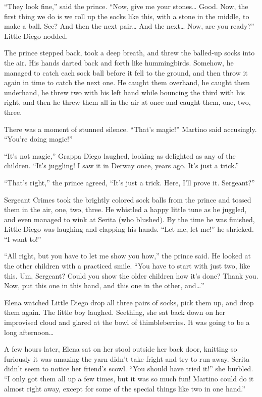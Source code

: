 \documentclass[10pt]{book}
\begin{document}
``They look fine,'' said the prince. ``Now, give me your stones{\ldots} Good. Now, the first thing we do is we roll up the socks like this, with a stone in the middle, to make a ball. See? And then the next pair{\ldots} And the next{\ldots} Now, are you ready?'' Little Diego nodded.

The prince stepped back, took a deep breath, and threw the balled-up socks into the air. His hands darted back and forth like hummingbirds. Somehow, he managed to catch each sock ball before it fell to the ground, and then throw it again in time to catch the next one. He caught them overhand, he caught them underhand, he threw two with his left hand while bouncing the third with his right, and then he threw them all in the air at once and caught them, one, two, three.

There was a moment of stunned silence. ``That's magic!'' Martino said accusingly. ``You're doing magic!''

``It's not magic,'' Grappa Diego laughed, looking as delighted as any of the children. ``It's juggling! I saw it in Derway once, years ago. It's just a trick.''

``That's right,'' the prince agreed, ``It's just a trick. Here, I'll prove it. Sergeant?''

Sergeant Crimes took the brightly colored sock balls from the prince and tossed them in the air, one, two, three. He whistled a happy little tune as he juggled, and even managed to wink at Serita (who blushed). By the time he was finished, Little Diego was laughing and clapping his hands. ``Let me, let me!'' he shrieked. ``I want to!''

``All right, but you have to let me show you how,'' the prince said. He looked at the other children with a practiced smile. ``You have to start with just two, like this. Um, Sergeant? Could you show the older children how it's done? Thank you. Now, put this one in this hand, and this one in the other, and{\ldots}''

Elena watched Little Diego drop all three pairs of socks, pick them up, and drop them again. The little boy laughed. Seething, she sat back down on her improvised cloud and glared at the bowl of thimbleberries.  It was going to be a long afternoon{\ldots}

A few hours later, Elena sat on her stool outside her back door, knitting so furiously it was amazing the yarn didn't take fright and try to run away. Serita didn't seem to notice her friend's scowl. ``You should have tried it!'' she burbled. ``I only got them all up a few times, but it was so much fun! Martino could do it almost right away, except for some of the special things like two in one hand.''
\end{document}
